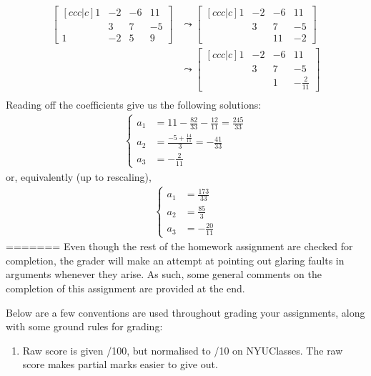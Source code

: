 \documentclass[answers,11pt]{exam}
\theoremstyle{definition}
\theoremstyle{definition}
\DeclareMathOperator{\1}{\mathbbm{1}}
\begin{document}
\begin{questions}
\begin{solution}
	\begin{align*}
	\begin{bmatrix}[c c c | c]
	1 & -2 & -6 & 11 \\ & 3 & 7 & -5 \\ 1 & -2 & 5 & 9
	\end{bmatrix} & \leadsto \begin{bmatrix}[c c c | c]
	1 & -2 & -6 & 11 \\ & 3 & 7 & -5 \\  &  & 11 & -2
	\end{bmatrix} \\
	&\leadsto \begin{bmatrix}[c c c | c]
	1 & -2 & -6 & 11 \\ & 3 & 7 & -5 \\  &  & 1 & -\frac{2}{11}
	\end{bmatrix} \\
	\end{align*}
	Reading off the coefficients give us the following solutions:
	\begin{align*}
	\begin{cases}
	a_1 &= 11 - \frac{82}{33} - \frac{12}{11} =  \frac{245}{33} \\
	a_2 &= \frac{-5 + \frac{14}{11}}{3} = -\frac{41}{33} \\
	a_3 &= -\frac{2}{11}
	\end{cases}
	\end{align*}
	or, equivalently (up to rescaling),
	\begin{align*}
	\begin{cases}
	a_1 &= \frac{173}{33} \\
	a_2 &= \frac{85}{3} \\
	a_3 &= -\frac{20}{11}
	\end{cases}
	\end{align*}
=======
Even though the rest of the homework assignment are checked for completion, the grader will make an attempt at pointing out glaring faults in arguments whenever they arise. As such, some general comments on the completion of this assignment are provided at the end. 

Below are a few conventions are used throughout grading your assignments, along with some ground rules for grading:


\begin{enumerate}[itemsep=.75em]
>>>>>>> 0947e05d644d33248c5a5d2a69656129614c9393:Linear-Algebra-Assignment-2-Solutions-and-Comments.tex
	
	\item Raw score is given /100, but normalised to /10 on NYUClasses. The raw score makes partial marks easier to give out.
	

\end{enumerate}
\end{solution}
\end{questions}
\end{document}
